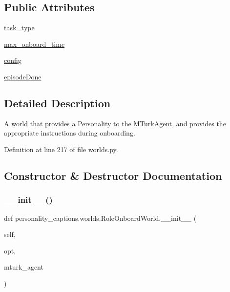 \subsection*{Public Attributes}
\begin{DoxyCompactItemize}
\item 
\hyperlink{classpersonality__captions_1_1worlds_1_1RoleOnboardWorld_a6cf6206af24cf6a9402f23f620d4e365}{task\+\_\+type}
\item 
\hyperlink{classpersonality__captions_1_1worlds_1_1RoleOnboardWorld_aa6108733e26c2d1761e8155a65c2df12}{max\+\_\+onboard\+\_\+time}
\item 
\hyperlink{classpersonality__captions_1_1worlds_1_1RoleOnboardWorld_ade4545af6ba49e704c8df5d223c330f0}{config}
\item 
\hyperlink{classpersonality__captions_1_1worlds_1_1RoleOnboardWorld_a6f13341d6fc898dc7701a7e99133b885}{episode\+Done}
\end{DoxyCompactItemize}


\subsection{Detailed Description}
\begin{DoxyVerb}A world that provides a Personality to the MTurkAgent, and provides the appropriate
instructions during onboarding.
\end{DoxyVerb}
 

Definition at line 217 of file worlds.\+py.



\subsection{Constructor \& Destructor Documentation}
\mbox{\label{classpersonality__captions_1_1worlds_1_1RoleOnboardWorld_a7c26e32198909d8f4527ac967605adb0}} 
\subsubsection{\texorpdfstring{\+\_\+\+\_\+init\+\_\+\+\_\+()}{\_\_init\_\_()}}
{\footnotesize\ttfamily def personality\+\_\+captions.\+worlds.\+Role\+Onboard\+World.\+\_\+\+\_\+init\+\_\+\+\_\+ (\begin{DoxyParamCaption}\item[{}]{self,  }\item[{}]{opt,  }\item[{}]{mturk\+\_\+agent }\end{DoxyParamCaption})}



